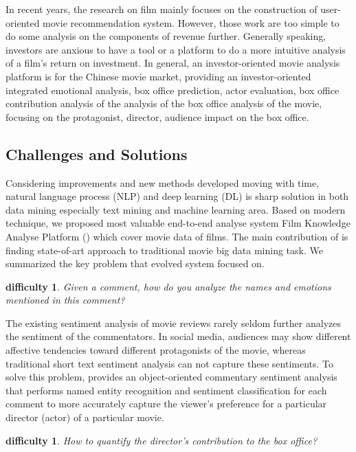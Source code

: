 \par In recent years, the research on film mainly focuses on the construction of user-oriented movie recommendation system\cite{diao2014jointly,tang2015user}. However, those work are too simple to do some analysis on the components of revenue further. Generally speaking, investors are anxious to have a tool or a platform to do a more intuitive analysis of a film's return on investment. In general, an investor-oriented movie analysis platform is for the Chinese movie market, providing an investor-oriented integrated emotional analysis, box office prediction, actor evaluation, box office contribution analysis of the analysis of the box office analysis of the movie, focusing on the protagonist, director, audience impact on the box office.
\subsection{Challenges and Solutions}
Considering improvements and new methods developed moving with time, natural language process (NLP) and deep learning (DL) is sharp solution in both data mining especially text mining and machine learning area. Based on modern technique, we proposed most valuable end-to-end analyse system Film Knowledge Analyse Platform (\system) which cover movie data of films. The main contribution of \system is finding state-of-art approach to traditional movie big data mining task. We summarized the key problem that evolved system \system focused on.
\newtheorem{difficulties}[theorem]{difficulty}
\begin{difficulties}
Given a comment, how do you analyze the names and emotions mentioned in this comment? \end{difficulties}
\par The existing sentiment analysis of movie reviews rarely seldom further analyzes the sentiment of the commentators. In social media, audiences may show different affective tendencies toward different protagonists of the movie, whereas traditional short text sentiment analysis can not capture these sentiments. To solve this problem, \system provides an object-oriented commentary sentiment analysis that performs named entity recognition and sentiment classification for each comment to more accurately capture the viewer's preference for a particular director (actor) of a particular movie.
\begin{difficulties}
How to quantify the director's contribution to the box office?
\end{difficulties}
